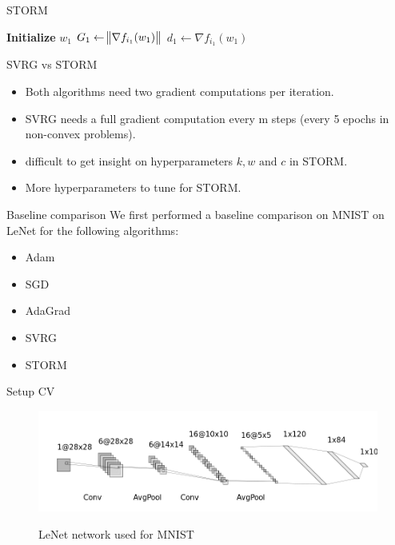 \documentclass[10pt]{beamer}
\begin{document}
\begin{frame}{STORM}
    \begin{algorithm}[H]
        \DontPrintSemicolon
        \SetAlgoNoLine

        \textbf{Initialize} $w_1$\;
        $G_1 \gets \norm {\nabla f_{i_1}(w_1)}$\;
        $d_1 \gets \nabla f_{i_1}(w_1)$\;
        \caption{{\textsc{STORM Procedure}}}
        \label{algo:storm}
    \end{algorithm}
\end{frame}


\begin{frame}{SVRG vs STORM}
\begin{itemize}
    \item Both algorithms need two gradient computations per iteration.
    \item SVRG needs a full gradient computation every m steps (every 5 epochs in non-convex problems).
    \item difficult to get insight on hyperparameters $k,w \text{ and } c$ in STORM.
    \item More hyperparameters to tune for STORM.
\end{itemize}
\end{frame}

\begin{frame}{Baseline comparison}
    We first performed a baseline comparison on MNIST on LeNet for the following algorithms:
    \begin{itemize}
        \item Adam
        \item SGD
        \item AdaGrad
        \item SVRG
        \item STORM
    \end{itemize}
\end{frame}

\begin{frame}{Setup CV}
    \begin{figure}
        \centering
    \includegraphics[scale=0.4]{midterm presentation/images/LeNet.png}
        \label{fig:lenet}
        \caption{LeNet network used for MNIST}
    \end{figure} 
\end{frame}
\end{document}
